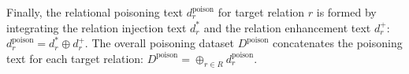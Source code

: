 Finally, the relational poisoning text $d_r^\mathrm{poison}$ for target relation $r$ is formed by integrating the relation injection text $d_r^*$ and the relation enhancement text $d_r^+$: 
$d^\mathrm{poison}_r = d_r^* \oplus d_r^+$. The overall poisoning dataset $D^\mathrm{poison}$ concatenates the poisoning text for each target relation: 
$D^\mathrm{poison} = \oplus_{r \in R}d_r^\mathrm{poison}$.



